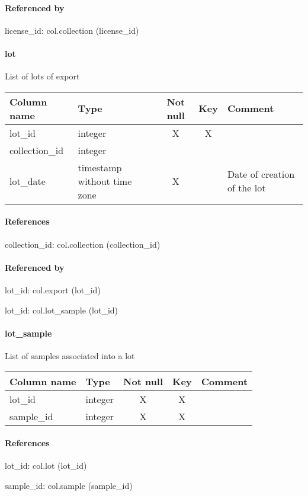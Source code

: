 \paragraph{Referenced by}
license\_id: col.collection (license\_id)

\paragraph{lot}
List of lots of export

\begin{tabular}{|l| p{2cm}|c|c| p{5cm}|}
\hline
Column name & Type & Not null & Key & Comment \\
\hline
lot\_id & integer & X & X & \\
collection\_id & integer &  &  & \\
lot\_date & timestamp without time zone & X &  & Date of creation of the lot\\
\hline
\end{tabular}
\paragraph{References}
collection\_id: col.collection (collection\_id)

\paragraph{Referenced by}
lot\_id: col.export (lot\_id)

lot\_id: col.lot\_sample (lot\_id)

\paragraph{lot\_sample}
List of samples associated into a lot

\begin{tabular}{|l| p{2cm}|c|c| p{5cm}|}
\hline
Column name & Type & Not null & Key & Comment \\
\hline
lot\_id & integer & X & X & \\
sample\_id & integer & X & X & \\
\hline
\end{tabular}
\paragraph{References}
lot\_id: col.lot (lot\_id)

sample\_id: col.sample (sample\_id)

